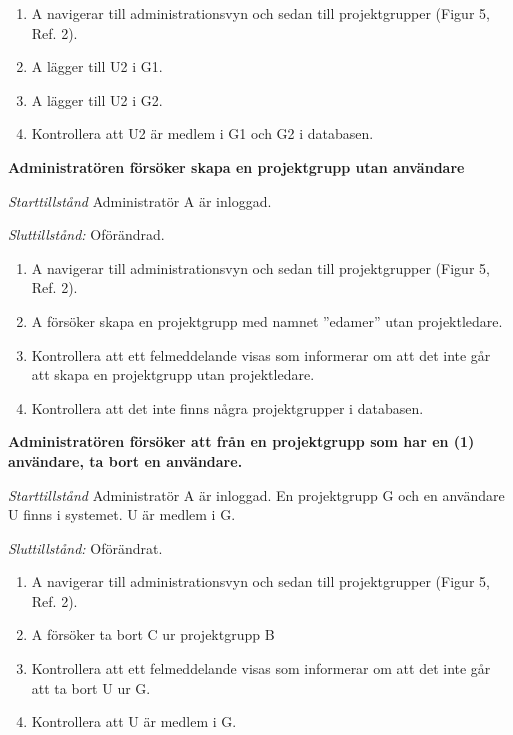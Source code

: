 \documentclass[a4paper]{article}
\begin{document}
\begin{FT}
\begin{enumerate}
\item A navigerar till administrationsvyn och sedan till projektgrupper (Figur 5, Ref. 2).
\item A lägger till U2 i G1.
\item A lägger till U2 i G2.
\item Kontrollera att U2 är medlem i G1 och G2 i databasen.

\end{enumerate}

\item
\textbf{Administratören försöker skapa en projektgrupp utan användare}

\emph{Starttillstånd} Administratör A är inloggad.

\emph{Sluttillstånd:} Oförändrad.

\begin{enumerate}

\item A navigerar till administrationsvyn och sedan till projektgrupper (Figur 5, Ref. 2).
\item A försöker skapa en projektgrupp med namnet ''edamer'' utan projektledare.
\item Kontrollera att ett felmeddelande visas som informerar om att det inte går att skapa en projektgrupp utan projektledare.
\item Kontrollera att det inte finns några projektgrupper i databasen.
\end{enumerate}

\item
\textbf{Administratören försöker att från en projektgrupp som har en (1) användare, ta bort en användare.}

\emph{Starttillstånd} Administratör A är inloggad. En projektgrupp G och en användare U finns i systemet. U är medlem i G.

\emph{Sluttillstånd:} Oförändrat.

\begin{enumerate}
\item A navigerar till administrationsvyn och sedan till projektgrupper (Figur 5, Ref. 2).
\item A försöker ta bort C ur projektgrupp B
\item Kontrollera att ett felmeddelande visas som informerar om att det inte går att ta bort U ur G.
\item Kontrollera att U är medlem i G.
\end{enumerate}


\end{FT}
\end{document}
